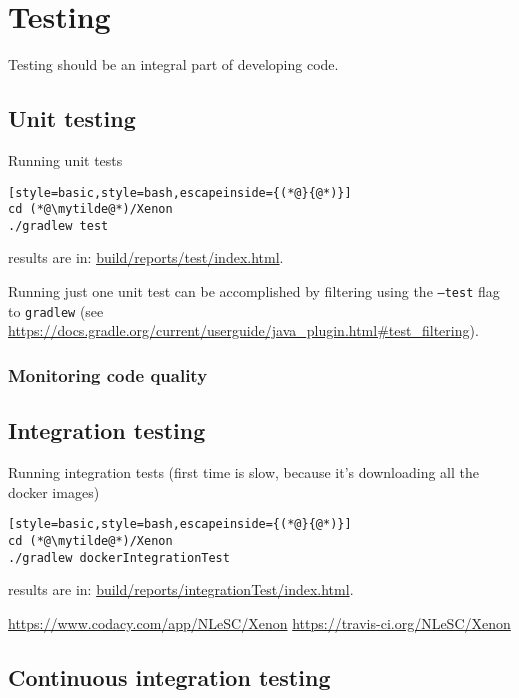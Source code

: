 

\section{Testing}
\label{sec:testing}
Testing should be an integral part of developing code.

\subsection{Unit testing}


Running unit tests
\begin{lstlisting}[style=basic,style=bash,escapeinside={(*@}{@*)}]
cd (*@\mytilde@*)/Xenon
./gradlew test
\end{lstlisting}
results are in: \url{build/reports/test/index.html}.

Running just one unit test can be accomplished by filtering using the \texttt{--test} flag to \texttt{gradlew} (see \url{https://docs.gradle.org/current/userguide/java_plugin.html#test_filtering}).




\subsubsection{Monitoring code quality}





\subsection{Integration testing}
\label{sec:integration-testing}
Running integration tests (first time is slow, because it's downloading all the docker images)
\begin{lstlisting}[style=basic,style=bash,escapeinside={(*@}{@*)}]
cd (*@\mytilde@*)/Xenon
./gradlew dockerIntegrationTest
\end{lstlisting}
results are in: \url{build/reports/integrationTest/index.html}.


\url{https://www.codacy.com/app/NLeSC/Xenon}
\url{https://travis-ci.org/NLeSC/Xenon}


\subsection{Continuous integration testing}
